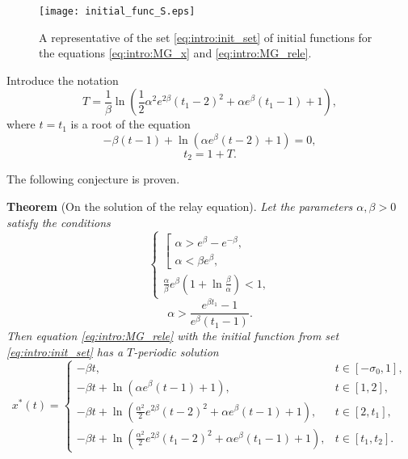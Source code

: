 \begin{figure}
	\centering
	\texttt{[image: initial\_func\_S.eps]}
	\caption{A representative of the set \eqref{eq:intro:init_set} of initial functions for the equations \eqref{eq:intro:MG_x} and \eqref{eq:intro:MG_rele}.}
	\label{fig:intro:initial_funcs:ch1}
\end{figure}

Introduce the notation
\begin{equation}
	\label{eq:intro:T}
	T = \frac{1}{\beta} \ln\left(\frac{1}{2}\alpha^2e^{2\beta}(t_1 - 2)^2 + \alpha e^{\beta}(t_1 - 1) + 1\right),
\end{equation}
where $t = t_1$ is a root of the equation
\begin{equation}
	\label{eq:intro:t1_cond_exp}
	-\beta(t - 1) + \ln(\alpha e^{\beta}(t - 2) + 1) = 0,
\end{equation}
\begin{equation}
	\label{eq:intro:t2_period}
	t_2 = 1 + T.
\end{equation}

The following conjecture is proven.

\textbf{Theorem} (On the solution of the relay equation). \textit{
	Let the parameters $\alpha, \beta > 0$ satisfy the conditions
	\begin{equation}
		\label{eq:intro:cond_alpha1}
		\begin{cases}
			\left[
			\begin{array}{ll}
				\alpha > e^{\beta} - e^{-\beta},\\
				\alpha < \beta e^{\beta},
			\end{array}
			\right.\\
			\frac{\alpha}{\beta}e^{\beta}\left(1 + \ln\frac{\beta}{\alpha}\right) < 1,
		\end{cases}
	\end{equation}
	\begin{equation}
		\label{eq:intro:cond_alpha2}
		\alpha > \dfrac{e^{\beta t_1} - 1}{e^{\beta}(t_1 - 1)}.
	\end{equation}
	Then equation \eqref{eq:intro:MG_rele} with the initial function from set \eqref{eq:intro:init_set} has a $T$-periodic solution
	\small
	\begin{equation}
		\label{eq:intro:sol_x_star}
		x^*(t)= 
		\begin{cases}
			-\beta t, & t\in[-\sigma_0, 1],\\
			-\beta t +\ln(\alpha e^{\beta}(t - 1)+1), & t\in[1, 2],\\
			-\beta t + \ln(\frac{\alpha^2}{2}e^{2\beta}(t - 2)^2+\alpha e^{\beta}(t - 1)+1), & t\in[2, t_1],\\
			-\beta t + \ln(\frac{\alpha^2}{2}e^{2\beta}(t_1 - 2)^2+\alpha e^{\beta}(t_1 - 1) + 1), & t\in[t_1, t_2].
		\end{cases}
	\end{equation}
	\normalsize
}

